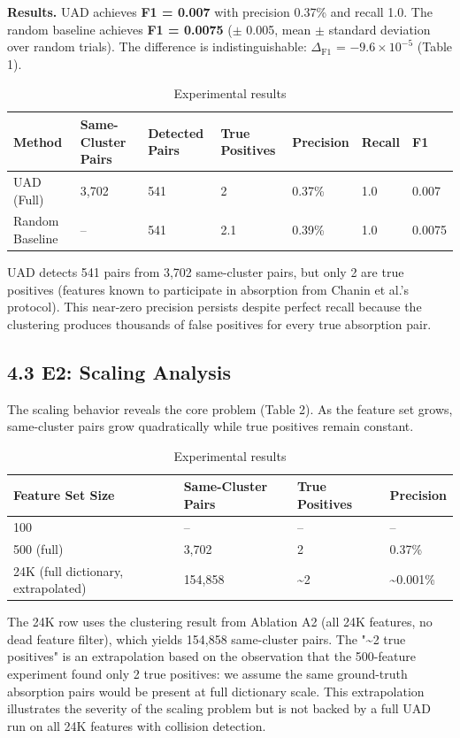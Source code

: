 \documentclass{article}
\begin{document}
\textbf{Results.} UAD achieves \textbf{F1 = 0.007} with precision 0.37\% and recall 1.0. The random baseline achieves \textbf{F1 = 0.0075} ($\pm$ 0.005, mean $\pm$ standard deviation over random trials). The difference is indistinguishable: $\Delta_{\text{F1}}$ = $-9.6 \times 10^{-5}$ (Table 1).

\begin{table}[ht]
\centering
\begin{tabular}{lllllll}
\toprule
Method & Same-Cluster Pairs & Detected Pairs & True Positives & Precision & Recall & F1 \\
\midrule
UAD (Full) & 3,702 & 541 & 2 & 0.37\% & 1.0 & 0.007 \\
Random Baseline & -- & 541 & 2.1 & 0.39\% & 1.0 & 0.0075 \\
\bottomrule
\end{tabular}
\caption{Experimental results}
\end{table}

UAD detects 541 pairs from 3,702 same-cluster pairs, but only 2 are true positives (features known to participate in absorption from Chanin et al.'s protocol). This near-zero precision persists despite perfect recall because the clustering produces thousands of false positives for every true absorption pair.

\subsection{4.3 E2: Scaling Analysis}

The scaling behavior reveals the core problem (Table 2). As the feature set grows, same-cluster pairs grow quadratically while true positives remain constant.

\begin{table}[ht]
\centering
\begin{tabular}{llll}
\toprule
Feature Set Size & Same-Cluster Pairs & True Positives & Precision \\
\midrule
100 & -- & -- & -- \\
500 (full) & 3,702 & 2 & 0.37\% \\
24K (full dictionary, extrapolated) & 154,858 & \textasciitilde{}2 & \textasciitilde{}0.001\% \\
\bottomrule
\end{tabular}
\caption{Experimental results}
\end{table}

The 24K row uses the clustering result from Ablation A2 (all 24K features, no dead feature filter), which yields 154,858 same-cluster pairs. The "\textasciitilde{}2 true positives" is an extrapolation based on the observation that the 500-feature experiment found only 2 true positives: we assume the same ground-truth absorption pairs would be present at full dictionary scale. This extrapolation illustrates the severity of the scaling problem but is not backed by a full UAD run on all 24K features with collision detection.
\end{document}
